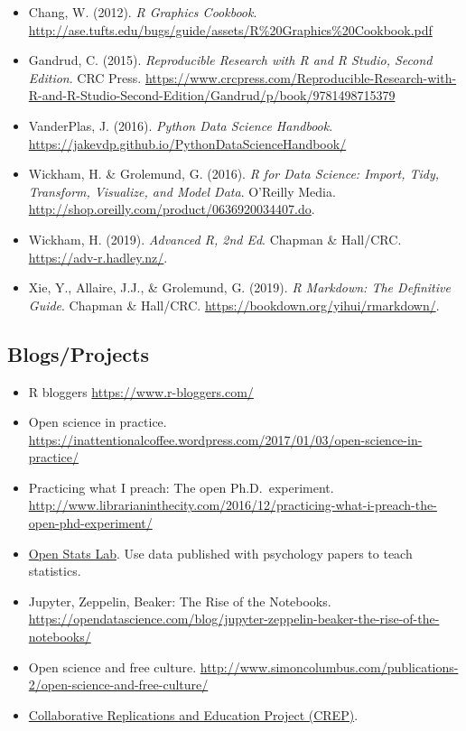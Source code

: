 \documentclass[
]{article}
\providecommand{\tightlist}{%
  \setlength{\itemsep}{0pt}\setlength{\parskip}{0pt}}
\begin{document}
\begin{itemize}
\tightlist
\item
  Chang, W. (2012). \emph{R Graphics Cookbook}.
  \url{http://ase.tufts.edu/bugs/guide/assets/R\%20Graphics\%20Cookbook.pdf}
\item
  Gandrud, C. (2015). \emph{Reproducible Research with R and R Studio,
  Second Edition}. CRC Press.
  \url{https://www.crcpress.com/Reproducible-Research-with-R-and-R-Studio-Second-Edition/Gandrud/p/book/9781498715379}
\item
  VanderPlas, J. (2016). \emph{Python Data Science Handbook}.
  \url{https://jakevdp.github.io/PythonDataScienceHandbook/}
\item
  Wickham, H. \& Grolemund, G. (2016). \emph{R for Data Science: Import,
  Tidy, Transform, Visualize, and Model Data}. O'Reilly Media.
  \url{http://shop.oreilly.com/product/0636920034407.do}.
\item
  Wickham, H. (2019). \emph{Advanced R, 2nd Ed}. Chapman \& Hall/CRC.
  \url{https://adv-r.hadley.nz/}.
\item
  Xie, Y., Allaire, J.J., \& Grolemund, G. (2019). \emph{R Markdown: The
  Definitive Guide}. Chapman \& Hall/CRC.
  \url{https://bookdown.org/yihui/rmarkdown/}.
\end{itemize}

\hypertarget{blogsprojects}{%
\subsection{Blogs/Projects}\label{blogsprojects}}

\begin{itemize}
\tightlist
\item
  R bloggers \url{https://www.r-bloggers.com/}
\item
  Open science in practice.
  \url{https://inattentionalcoffee.wordpress.com/2017/01/03/open-science-in-practice/}
\item
  Practicing what I preach: The open Ph.D.~experiment.
  \url{http://www.librarianinthecity.com/2016/12/practicing-what-i-preach-the-open-phd-experiment/}
\item
  \href{https://sites.trinity.edu/osl}{Open Stats Lab}. Use data
  published with psychology papers to teach statistics.
\item
  Jupyter, Zeppelin, Beaker: The Rise of the Notebooks.
  \url{https://opendatascience.com/blog/jupyter-zeppelin-beaker-the-rise-of-the-notebooks/}
\item
  Open science and free culture.
  \url{http://www.simoncolumbus.com/publications-2/open-science-and-free-culture/}
\item
  \href{https://osf.io/wfc6u/}{Collaborative Replications and Education
  Project (CREP)}.
\end{itemize}
\end{document}
